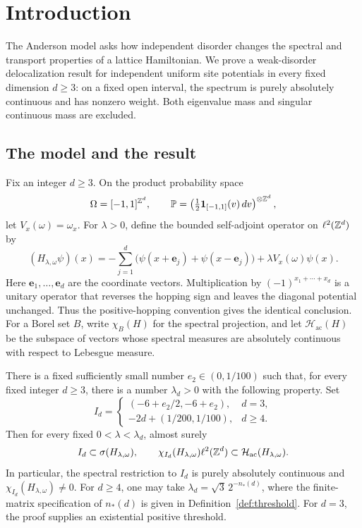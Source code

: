 \section{Introduction}\label{sec:introduction}

The Anderson model asks how independent disorder changes the spectral
and transport properties of a lattice Hamiltonian. We prove a
weak-disorder delocalization result for independent uniform site
potentials in every fixed dimension $d\ge3$: on a fixed open interval,
the spectrum is purely absolutely continuous and has nonzero weight.
Both eigenvalue mass and singular continuous mass are excluded.

\subsection{The model and the result}

Fix an integer $d\ge3$. On the product probability space
\[
 \Omega=[-1,1]^{\mathbb Z^d},\qquad
 \mathbb P=\left(\tfrac12\mathbf1_{[-1,1]}(v)\,dv\right)^{\otimes\mathbb Z^d},
\]
let $V_x(\omega)=\omega_x$. For $\lambda>0$, define the bounded
self-adjoint operator on $\ell^2(\mathbb Z^d)$ by
\begin{equation}\label{eq:model}
 (H_{\lambda,\omega}\psi)(x)
 =-\sum_{j=1}^d\bigl(\psi(x+\mathbf e_j)+\psi(x-\mathbf e_j)\bigr)
   +\lambda V_x(\omega)\psi(x).
\end{equation}
Here $\mathbf e_1,\ldots,\mathbf e_d$ are the coordinate vectors.
Multiplication by $(-1)^{x_1+\cdots+x_d}$ is a unitary operator that
reverses the hopping sign and leaves the diagonal potential unchanged.
Thus the positive-hopping convention gives the identical conclusion.
For a Borel set $B$, write $\chi_B(H)$ for the spectral projection,
and let $\mathcal H_{\mathrm{ac}}(H)$ be the subspace of vectors whose
spectral measures are absolutely continuous with respect to Lebesgue
measure.

\begin{theorem}\label{thm:main}
There is a fixed sufficiently small number $e_2\in(0,1/100)$ such that,
for every fixed integer $d\ge3$, there is a number $\lambda_d>0$
with the following property. Set
\begin{equation}\label{eq:energy-windows}
 I_d=
 \begin{cases}
   (-6+e_2/2,-6+e_2),&d=3,\\
   -2d+(1/200,1/100),&d\ge4.
 \end{cases}
\end{equation}
Then
for every fixed $0<\lambda<\lambda_d$, almost surely
\[
 I_d\subset\sigma(H_{\lambda,\omega}),\qquad
 \chi_{I_d}(H_{\lambda,\omega})\ell^2(\mathbb Z^d)
       \subset\mathcal H_{\mathrm{ac}}(H_{\lambda,\omega}).
\]
In particular, the spectral restriction to $I_d$ is purely absolutely
continuous and $\chi_{I_d}(H_{\lambda,\omega})\ne0$.
For $d\ge4$, one may take $\lambda_d=\sqrt3\,2^{-n_*(d)}$, where the finite-matrix
specification of $n_*(d)$ is given in Definition~\ref{def:threshold}.
For $d=3$, the proof supplies an existential positive threshold.
\end{theorem}

